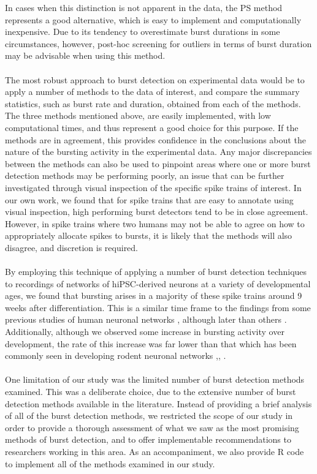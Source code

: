 \documentclass[12pt, titlepage]{article}
\begin{document}
In cases when this distinction is not apparent in the data, the PS method represents a good alternative, which is easy to implement and computationally inexpensive. Due to its tendency to overestimate burst durations in some circumstances, however, post-hoc screening for outliers in terms of burst duration may be advisable when using this method.  
\\ \\The most robust approach to burst detection on experimental data would be to apply a number of methods to the data of interest, and compare the summary statistics, such as burst rate and duration, obtained from each of the methods. The three methods mentioned above, are easily implemented, with low computational times, and thus represent a good choice for this purpose. If the methods are in agreement, this provides confidence in the conclusions about the nature of the bursting activity in the experimental data. Any major discrepancies between the methods can also be used to pinpoint areas where one or more burst detection methods may be performing poorly, an issue that can be further investigated through visual inspection of the specific spike trains of interest. In our own work, we found that for spike trains that are easy to annotate using visual inspection, high performing burst detectors tend to be in close agreement. However, in spike trains where two humans may not be able to agree on how to appropriately allocate spikes to bursts, it is likely that the methods will also disagree, and discretion is required.
\\ \\By employing this technique of applying a number of burst detection techniques to recordings of networks of hiPSC-derived neurons at a variety of developmental ages, we found that bursting arises in a majority of these spike trains around 9 weeks after differentiation.  This is a similar time frame to the findings from some previous studies of human neuronal networks \cite{Heikkila2009}, although later than others \cite{Illes2007}. Additionally, although we observed some increase in bursting activity over development, the rate of this increase was far lower than that which has been commonly seen in developing rodent neuronal networks \cite{Chiappalone2005},\cite{Charlesworth2015}, \cite{Demas2003} .
\\ \\One limitation of our study was the limited number of burst detection methods examined. This was a deliberate choice, due to the extensive number of burst detection methods available in the literature. Instead of providing a brief analysis of all of the burst detection methods, we restricted the scope of our study in order to provide a thorough assessment of what we saw as the most promising methods of burst detection, and to offer implementable recommendations to researchers working in this area. As an accompaniment, we also provide R code to implement all of the methods examined in our study.
\end{document}
